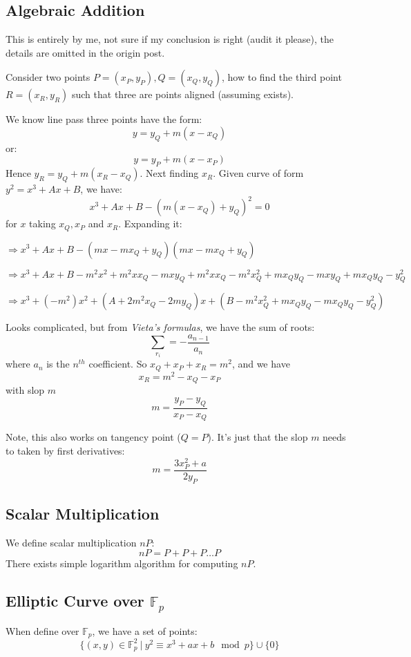 \documentclass[10pt]{article}
\newcommand{\FField}{\mathbb{F}_p}
\begin{document}
\subsection{Algebraic Addition}
This is entirely by me, not sure if my conclusion is right (audit it please),
the details are omitted in the origin post.

Consider two points $P = (x_P, y_P), Q = (x_Q, y_Q)$, how to find the third
point $R = (x_R, y_R)$ such that three are points aligned (assuming exists).

We know line pass three points have the form:
\[
    y = y_Q + m(x - x_Q)
\]
or:
\[
    y = y_P + m(x - x_P)
\]
Hence $y_R = y_Q + m(x_R - x_Q)$. Next finding $x_R$. Given curve of form $y^2 =
x^3 + Ax + B$, we have:
\[
    x^3 + Ax + B - (m(x - x_Q) + y_Q)^2 = 0
\]
for $x$ taking $x_Q,x_P$ and $x_R$. Expanding it:
\begin{description}
    \item $\Longrightarrow x^3 + Ax + B - (mx - mx_Q + y_Q)(mx - mx_Q + y_Q)$
    \item $\Longrightarrow x^3 + Ax + B - m^2x^2 + m^2xx_Q - mxy_Q + m^2xx_Q
        - m^2{x^2_Q} + mx_Qy_Q - mxy_Q + mx_Qy_Q - {y^2_Q}$
    \item $\Longrightarrow x^3 + (-m^2)x^2 + (A + 2m^2x_Q - 2my_Q)x + (B -
        m^2x^2_Q + mx_Qy_Q - mx_Qy_Q - y^2_Q)$
\end{description}
Looks complicated, but from \emph{Vieta's formulas}, we have the sum of roots:
\[
\sum_{r_i} = -\frac{a_{n-1}}{a_n}
\]
where $a_n$ is the $n^{th}$ coefficient. So $x_Q + x_P + x_R = m^2$, and we have
\[
    x_R = m^2 - x_Q - x_P
\]
with slop $m$
\[
    m = \frac{y_P - y_Q}{x_P - x_Q}
\]

Note, this also works on tangency point ($Q = P$). It's just that the slop $m$ needs to
taken by first derivatives:
\[
    m = \frac{3x^2_P+a}{2y_P}
\]

\subsection{Scalar Multiplication}
We define scalar multiplication $nP$:
\[
    nP = P + P + P \ldots P
\]
There exists simple logarithm algorithm for computing $nP$.

\subsection{Elliptic Curve over $\FField$}
When define over $\FField$, we have a set of points:
\[
    \{(x, y) \in \FField^2\ \vert\ y^2 \equiv x^3 + ax + b \mod p\} \cup \{0\}
\]
\end{document}

